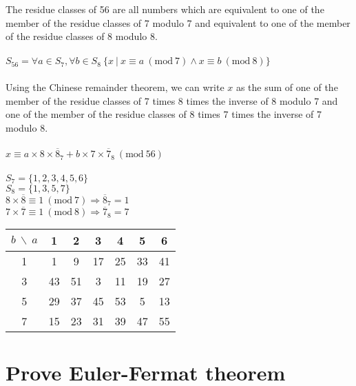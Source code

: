 \documentclass{article}
\newcommand{\congru}[3]{#1 \equiv #2\ (\text{mod}\ #3)}
\begin{document}
The residue classes of 56 are all numbers which are equivalent to one of the member of the residue classes of 7 modulo 7 and equivalent to one of the member of the residue classes of 8 modulo 8.\\\vspace*{-0.7em}\\
\hspace*{1em}$S_{56} = \forall a\in S_7, \forall b\in S_8\ \{ x\ |\ \congru{x}{a}{7} \wedge \congru{x}{b}{8} \}$\\\vspace*{-0.7em}\\
Using the Chinese remainder theorem, we can write $x$ as the sum of one of the member of the residue classes of 7 times 8 times the inverse of 8 modulo 7 and one of the member of the residue classes of 8 times 7 times the inverse of 7 modulo 8.\\\vspace*{-0.7em}\\
\hspace*{1em}$\congru{x}{a\times8\times\overline{8}_7 + b\times7\times\overline{7}_8}{56}$\\\vspace*{0em}\\
\hspace*{2em}$S_7 = \{1,2,3,4,5,6\}$\\
\hspace*{2em}$S_8 = \{1,3,5,7\}$\\
\hspace*{2em}$\congru{8\times\overline{8}}{1}{7} \Rightarrow \overline{8}_7 = 1$\\
\hspace*{2em}$\congru{7\times\overline{7}}{1}{8} \Rightarrow \overline{7}_8 = 7$\\

\begin{tabular}{|c||c|c|c|c|c|c|}
    \hline
    $b\ \backslash\ a$ & 1 & 2 & 3 & 4 & 5 & 6 \\
    \hline\hline
    1 & 1 & 9 & 17 & 25 & 33 & 41 \\ 
    \hline
    3 & 43 & 51 & 3 & 11 & 19 & 27 \\
    \hline
    5 & 29 & 37 & 45 & 53 & 5 & 13 \\
    \hline
    7 & 15 & 23 & 31 & 39 & 47 & 55 \\
    \hline
\end{tabular}


\section{Prove Euler-Fermat theorem}
\end{document}
